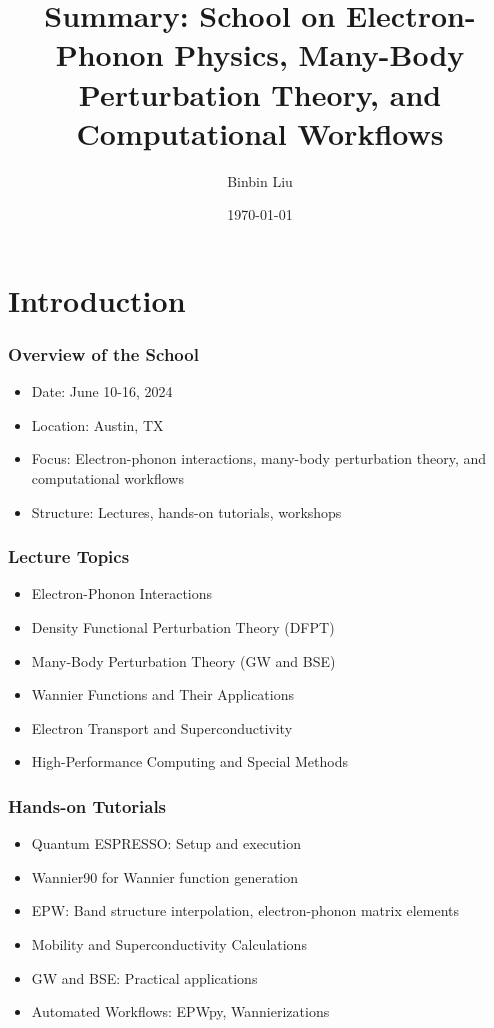 \documentclass{CustomBeamer}
\title{Summary: School on Electron-Phonon Physics, Many-Body Perturbation Theory, and Computational Workflows}
\author{Binbin Liu}
\institute{THEOS, EPFL}
\date{\today}
\begin{document}
\begin{frame}
    \titlepage
\end{frame}

\section{Introduction}
\begin{frame}
\frametitle{Overview of the School}
\begin{itemize}
    \item Date: June 10-16, 2024
    \item Location: Austin, TX
    \item Focus: Electron-phonon interactions, many-body perturbation theory, and computational workflows
    \item Structure: Lectures, hands-on tutorials, workshops
\end{itemize}
\end{frame}

\begin{frame}
    \frametitle{Lecture Topics }
    \begin{itemize}
        \item Electron-Phonon Interactions
        \item Density Functional Perturbation Theory (DFPT)
        \item Many-Body Perturbation Theory (GW and BSE) %
        \item Wannier Functions and Their Applications
        \item Electron Transport and Superconductivity %
        \item High-Performance Computing and Special Methods
    \end{itemize}
    \end{frame}
    
    \begin{frame}
    \frametitle{Hands-on Tutorials}
    \begin{itemize}
        \item Quantum ESPRESSO: Setup and execution
        \item Wannier90 for Wannier function generation
        \item EPW: Band structure interpolation, electron-phonon matrix elements
        \item Mobility and Superconductivity Calculations
        \item GW and BSE: Practical applications
        \item Automated Workflows: EPWpy, Wannierizations
    \end{itemize}
    \end{frame}
    
\end{document}
